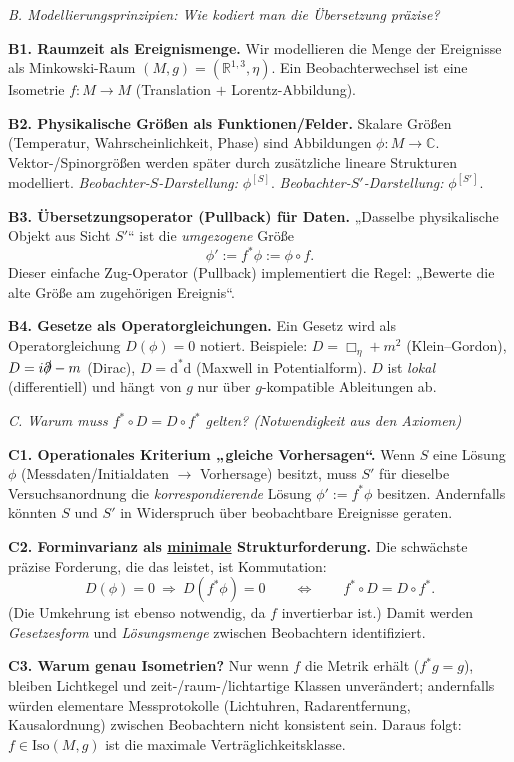 \documentclass[10pt, letterpaper]{article}
\newcommand{\R}{\mathbb{R}}
\newcommand{\C}{\mathbb{C}}
\begin{document}
\bigskip
\emph{B. Modellierungsprinzipien: Wie kodiert man die Übersetzung präzise?}

\textbf{B1. Raumzeit als Ereignismenge.}
Wir modellieren die Menge der Ereignisse als Minkowski-Raum $(M,g)=(\R^{1,3},\eta)$.
Ein Beobachterwechsel ist eine Isometrie $f:M\to M$ (Translation $+$ Lorentz-Abbildung).

\textbf{B2. Physikalische Größen als Funktionen/Felder.}
Skalare Größen (Temperatur, Wahrscheinlichkeit, Phase) sind Abbildungen $\phi:M\to\C$.
Vektor-/Spinorgrößen werden später durch zusätzliche lineare Strukturen modelliert.
\emph{Beobachter-$S$-Darstellung:} $\phi^{[S]}$.
\emph{Beobachter-$S'$-Darstellung:} $\phi^{[S']}$.

\textbf{B3. Übersetzungsoperator (Pullback) für Daten.}
„Dasselbe physikalische Objekt aus Sicht $S'$“ ist die \emph{umgezogene} Größe
\[
\phi' := f^*\phi := \phi\circ f.
\]
Dieser einfache Zug-Operator (Pullback) implementiert die Regel: 
„Bewerte die alte Größe am zugehörigen Ereignis“.

\textbf{B4. Gesetze als Operatorgleichungen.}
Ein Gesetz wird als Operatorgleichung $D(\phi)=0$ notiert. 
Beispiele:
$D=\Box_\eta+m^2$ (Klein–Gordon), $D=i\slashed{\partial}-m$ (Dirac), $D=\mathrm{d}^*\mathrm{d}$ (Maxwell in Potentialform).
$D$ ist \emph{lokal} (differentiell) und hängt von $g$ nur über $g$-kompatible Ableitungen ab.

\bigskip
\emph{C. Warum muss $f^*\!\circ D = D\circ f^*$ gelten? (Notwendigkeit aus den Axiomen)}

\textbf{C1. Operationales Kriterium „gleiche Vorhersagen“.}
Wenn $S$ eine Lösung $\phi$ (Messdaten/Initialdaten $\to$ Vorhersage) besitzt, muss $S'$ für dieselbe Versuchsanordnung die \emph{korrespondierende} Lösung $\phi':=f^*\phi$ besitzen. 
Andernfalls könnten $S$ und $S'$ in Widerspruch über beobachtbare Ereignisse geraten.

\textbf{C2. Forminvarianz als \underline{minimale} Strukturforderung.}
Die schwächste präzise Forderung, die das leistet, ist Kommutation:
\[
D(\phi)=0 \ \Longrightarrow\ D(f^*\phi)=0
\qquad\Longleftrightarrow\qquad
f^*\circ D = D\circ f^*.
\]
(Die Umkehrung ist ebenso notwendig, da $f$ invertierbar ist.)
Damit werden \emph{Gesetzesform} und \emph{Lösungsmenge} zwischen Beobachtern identifiziert.

\textbf{C3. Warum genau Isometrien?}
Nur wenn $f$ die Metrik erhält ($f^*g=g$), bleiben Lichtkegel und zeit-/raum-/lichtartige Klassen unverändert; andernfalls würden elementare Messprotokolle (Lichtuhren, Radarentfernung, Kausalordnung) zwischen Beobachtern nicht konsistent sein. 
Daraus folgt: $f\in\mathrm{Iso}(M,g)$ ist die maximale Verträglichkeitsklasse.
\end{document}
